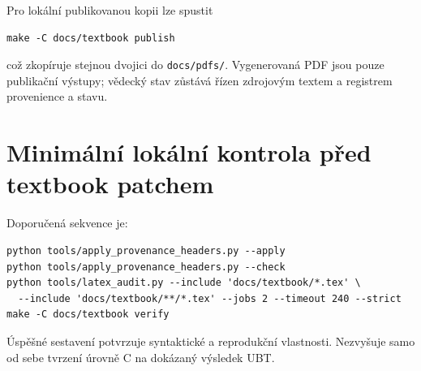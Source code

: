 Pro lokální publikovanou kopii lze spustit
\begin{verbatim}
make -C docs/textbook publish
\end{verbatim}
což zkopíruje stejnou dvojici do \texttt{docs/pdfs/}. Vygenerovaná PDF jsou
pouze publikační výstupy; vědecký stav zůstává řízen zdrojovým textem a
registrem provenience a stavu.

\section{Minimální lokální kontrola před textbook patchem}
Doporučená sekvence je:
\begin{verbatim}
python tools/apply_provenance_headers.py --apply
python tools/apply_provenance_headers.py --check
python tools/latex_audit.py --include 'docs/textbook/*.tex' \
  --include 'docs/textbook/**/*.tex' --jobs 2 --timeout 240 --strict
make -C docs/textbook verify
\end{verbatim}
Úspěšné sestavení potvrzuje syntaktické a reprodukční vlastnosti. Nezvyšuje samo od
sebe tvrzení úrovně C na dokázaný výsledek UBT.
